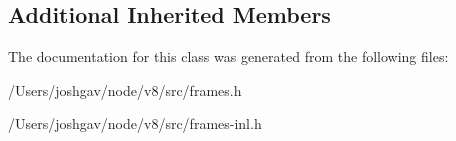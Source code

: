 \subsection*{Additional Inherited Members}


The documentation for this class was generated from the following files\+:\begin{DoxyCompactItemize}
\item 
/\+Users/joshgav/node/v8/src/frames.\+h\item 
/\+Users/joshgav/node/v8/src/frames-\/inl.\+h\end{DoxyCompactItemize}
